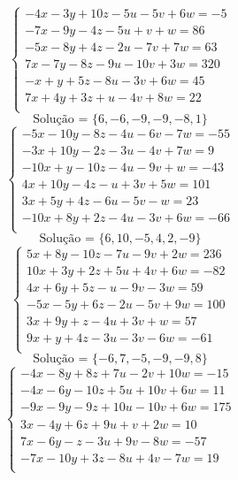 \documentclass[12pt,oneside,a4paper]{article}
\begin{document}
\vspace{\baselineskip}
\begin{equation*}
\begin{cases}
-4x-3y+10z-5u-5v+6w=-5 \\
-7x-9y-4z-5u+v+w=86 \\
-5x-8y+4z-2u-7v+7w=63 \\
7x-7y-8z-9u-10v+3w=320 \\
-x+y+5z-8u-3v+6w=45 \\
7x+4y+3z+u-4v+8w=22 \\
\end{cases}
\end{equation*}
\begin{equation*}
\text{Solução = }\{6,-6,-9,-9,-8,1\}
\end{equation*}
\vspace{\baselineskip}
\begin{equation*}
\begin{cases}
-5x-10y-8z-4u-6v-7w=-55 \\
-3x+10y-2z-3u-4v+7w=9 \\
-10x+y-10z-4u-9v+w=-43 \\
4x+10y-4z-u+3v+5w=101 \\
3x+5y+4z-6u-5v-w=23 \\
-10x+8y+2z-4u-3v+6w=-66 \\
\end{cases}
\end{equation*}
\begin{equation*}
\text{Solução = }\{6,10,-5,4,2,-9\}
\end{equation*}
\vspace{\baselineskip}
\begin{equation*}
\begin{cases}
5x+8y-10z-7u-9v+2w=236 \\
10x+3y+2z+5u+4v+6w=-82 \\
4x+6y+5z-u-9v-3w=59 \\
-5x-5y+6z-2u-5v+9w=100 \\
3x+9y+z-4u+3v+w=57 \\
9x+y+4z-3u-3v-6w=-61 \\
\end{cases}
\end{equation*}
\begin{equation*}
\text{Solução = }\{-6,7,-5,-9,-9,8\}
\end{equation*}
\vspace{\baselineskip}
\begin{equation*}
\begin{cases}
-4x-8y+8z+7u-2v+10w=-15 \\
-4x-6y-10z+5u+10v+6w=11 \\
-9x-9y-9z+10u-10v+6w=175 \\
3x-4y+6z+9u+v+2w=10 \\
7x-6y-z-3u+9v-8w=-57 \\
-7x-10y+3z-8u+4v-7w=19 \\
\end{cases}
\end{equation*}
\end{document}
